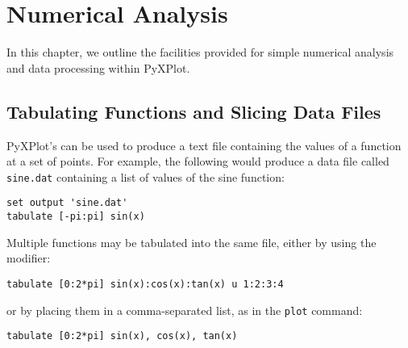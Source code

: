 %
%
%
%
%



\chapter{Numerical Analysis}
\label{gnuplot_ext_last}

In this chapter, we outline the facilities provided for simple numerical
analysis and data processing within PyXPlot.

\section{Tabulating Functions and Slicing Data Files}

PyXPlot's  can be used to produce a text file containing the
values of a function at a set of points.  For example, the following would
produce a data file called {\tt sine.dat} containing a list of values of the
sine function:

\begin{verbatim}
set output 'sine.dat'
tabulate [-pi:pi] sin(x)
\end{verbatim}

\noindent Multiple functions may be tabulated into the same file, either by
using the  modifier:

\begin{verbatim}
tabulate [0:2*pi] sin(x):cos(x):tan(x) u 1:2:3:4
\end{verbatim}

\noindent or by placing them in a comma-separated list, as in the {\tt plot}
command:

\begin{verbatim}
tabulate [0:2*pi] sin(x), cos(x), tan(x)
\end{verbatim}

